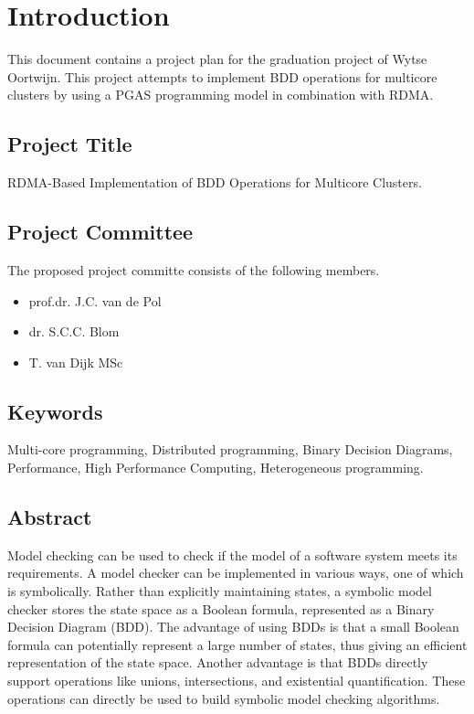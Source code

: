\chapter{Introduction}
This document contains a project plan for the graduation project of Wytse Oortwijn. This project attempts to implement BDD operations for multicore clusters by using a PGAS programming model in combination with RDMA. 

\section{Project Title}
RDMA-Based Implementation of BDD Operations for Multicore Clusters.

\section{Project Committee}
The proposed project committe consists of the following members.
\begin{itemize}
	\item prof.dr. J.C. van de Pol
	\item dr. S.C.C. Blom
	\item T. van Dijk MSc
\end{itemize}

\section{Keywords}
Multi-core programming, Distributed programming, Binary Decision Diagrams, Performance, High Performance Computing, Heterogeneous programming.

\section{Abstract}
Model checking can be used to check if the model of a software system meets its requirements. A model checker can be implemented in various ways, one of which is symbolically. Rather than explicitly maintaining states, a symbolic model checker stores the state space as a Boolean formula, represented as a Binary Decision Diagram (BDD). The advantage of using BDDs is that a small Boolean formula can potentially represent a large number of states, thus giving an efficient representation of the state space. Another advantage is that BDDs directly support operations like unions, intersections, and existential quantification. These operations can directly be used to build symbolic model checking algorithms.

